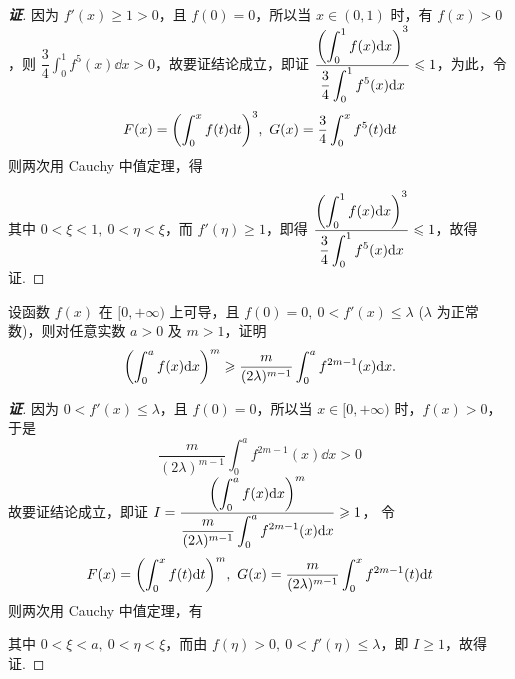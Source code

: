 \begin{proof}[{\songti \textbf{证}}]
    因为 $f'(x)\geqslant 1>0$，且 $f(0)=0$，所以当 $x\in(0,1)$ 时，有 $f(x)>0$，则 $\dfrac{3}{4}\displaystyle\int_{0}^{1}f^5(x)\dd x>0$，故要证结论成立，即证
    $\displaystyle\dfrac{\qty(\displaystyle\int_{0}^{1}f(x)\dd x)^3}{\dfrac{3}{4}\displaystyle\int_{0}^{1}f^5(x)\dd x}\leqslant 1$，为此，令
    $$F(x)=\qty(\int_{0}^{x}f(t)\dd t)^3,~G(x)=\dfrac{3}{4}\int_{0}^{x}f^5(t)\dd t$$
    则两次用 Cauchy 中值定理，得
    其中 $0<\xi<1,~0<\eta<\xi$，而 $f'(\eta)\geqslant 1$，即得 $\displaystyle\dfrac{\qty(\displaystyle\int_{0}^{1}f(x)\dd x)^3}{\dfrac{3}{4}\displaystyle\int_{0}^{1}f^5(x)\dd x}\leqslant 1$，故得证.
\end{proof}

\begin{inference}
    设函数 $f(x)$ 在 $[0,+\infty)$ 上可导，且 $f(0)=0,~0< f'(x)\leqslant \lambda$ ($\lambda$ 为正常数)，则对任意实数 $a>0$ 及 $m>1$，证明
    $$\qty(\int_{0}^{a}f(x)\dd x)^m\geqslant \dfrac{m}{(2\lambda)^{m-1}}\int_{0}^{a}f^{2m-1}(x)\dd x.$$
\end{inference}
\begin{proof}[{\songti \textbf{证}}]
    因为 $0<f'(x)\leqslant \lambda$，且 $f(0)=0$，所以当 $x\in[0,+\infty)$ 时，$f(x)>0$，于是 $$\displaystyle\dfrac{m}{(2\lambda)^{m-1}}\int_{0}^{a}f^{2m-1}(x)\dd x>0$$
    故要证结论成立，即证 $I=\dfrac{\qty(\displaystyle\int_{0}^{a}f(x)\dd x)^m}{\dfrac{m}{(2\lambda)^{m-1}}\displaystyle\int_{0}^{a}f^{2m-1}(x)\dd x}\geqslant 1$，
    令 $$\displaystyle F(x)=\qty(\int_{0}^{x}f(t)\dd t)^m,~G(x)=\dfrac{m}{(2\lambda)^{m-1}}\int_{0}^{x}f^{2m-1}(t)\dd t$$
    则两次用 Cauchy 中值定理，有
    其中 $0<\xi<a,~0<\eta<\xi$，而由 $f(\eta)>0,~0<f'(\eta)\leqslant \lambda$，即 $I\geqslant 1$，故得证.
\end{proof}

